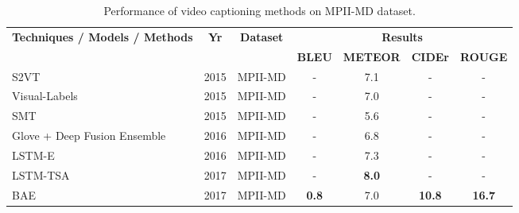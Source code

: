 \documentclass[10pt,journal,compsoc]{IEEEtran}
\begin{document}
\begin{table*}[htbp]
  \centering
  \small 
  \setlength{\tabcolsep}{10.0pt}       %
\caption{Performance of video captioning methods on MPII-MD dataset.}
 \vspace{-2mm}
    \begin{tabular}{|p{15.43em}|c|c|c|c|c|c|}
    \hline
    \multirow{2}[1]{*}{\textbf{Techniques / Models / Methods}} & \multirow{2}[1]{*}{\textbf{Yr}} & \multirow{2}[1]{*}{\textbf{Dataset}} & \multicolumn{4}{c|}{\textbf{Results}} \\
\cline{4-7}    \multicolumn{1}{|l|}{} & & & \textbf{BLEU} & \textbf{METEOR} & \textbf{CIDEr} & \textbf{ROUGE} \\
    \hline

    S2VT \cite{venugopalan2015sequence} & 2015  & {MPII-MD} & -     & 7.1   & -     & - \\
    \hline
    Visual-Labels \cite{rohrbach2015long} & 2015 & {MPII-MD} & - & 7.0 & - & - \\
    \hline
    SMT \cite{rohrbach2015dataset} & 2015 & {MPII-MD} & - & 5.6 & - & - \\
    \hline
    \multicolumn{1}{|l|}{Glove + Deep Fusion Ensemble \cite{venugopalan2016improving}}  & 2016  & MPII-MD  & - & 6.8  & - & - \\
    \hline
    LSTM-E \cite{pan2016jointly} & 2016  & MPII-MD & -     & 7.3   & -     & - \\
    \hline
    \multicolumn{1}{|l|}{LSTM-TSA \cite{Pan_2017_CVPR}} & 2017  & MPII-MD  & -  & \textbf{8.0} & - & - \\
    \hline
    \multicolumn{1}{|l|}{BAE \cite{Baraldi_2017_CVPR}} & 2017  & MPII-MD & \textbf{0.8} & 7.0 & \textbf{10.8} & \textbf{16.7} \\
    \hline

    \end{tabular}%
  \label{tab:mpiimdresults}%
 \end{table*}%
\end{document}
